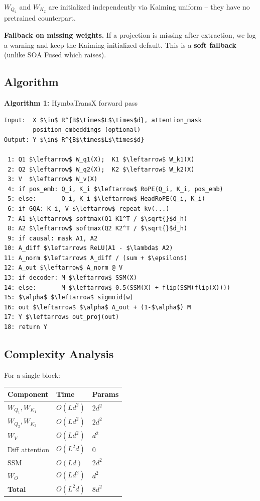 $W_{Q_2}$ and $W_{K_2}$ are initialized independently via Kaiming uniform -- 
they have no pretrained counterpart.

\textbf{Fallback on missing weights.} If a projection is missing after extraction, 
we log a warning and keep the Kaiming-initialized default. This is a 
\textbf{soft fallback} (unlike SOA Fused which raises).

\subsection{Algorithm}

\textbf{Algorithm 1:} HymbaTransX forward pass
\begin{lstlisting}
Input:  X $\in$ R^{B$\times$L$\times$d}, attention_mask
        position_embeddings (optional)
Output: Y $\in$ R^{B$\times$L$\times$d}

 1: Q1 $\leftarrow$ W_q1(X);  K1 $\leftarrow$ W_k1(X)
 2: Q2 $\leftarrow$ W_q2(X);  K2 $\leftarrow$ W_k2(X)
 3: V  $\leftarrow$ W_v(X)
 4: if pos_emb: Q_i, K_i $\leftarrow$ RoPE(Q_i, K_i, pos_emb)
 5: else:       Q_i, K_i $\leftarrow$ HeadRoPE(Q_i, K_i)
 6: if GQA: K_i, V $\leftarrow$ repeat_kv(...)
 7: A1 $\leftarrow$ softmax(Q1 K1^T / $\sqrt{}$d_h)
 8: A2 $\leftarrow$ softmax(Q2 K2^T / $\sqrt{}$d_h)
 9: if causal: mask A1, A2
10: A_diff $\leftarrow$ ReLU(A1 - $\lambda$ A2)
11: A_norm $\leftarrow$ A_diff / (sum + $\epsilon$)
12: A_out $\leftarrow$ A_norm @ V
13: if decoder: M $\leftarrow$ SSM(X)
14: else:       M $\leftarrow$ 0.5(SSM(X) + flip(SSM(flip(X))))
15: $\alpha$ $\leftarrow$ sigmoid(w)
16: out $\leftarrow$ $\alpha$ A_out + (1-$\alpha$) M
17: Y $\leftarrow$ out_proj(out)
18: return Y
\end{lstlisting}

\subsection{Complexity Analysis}

For a single block:

\begin{table}[H]
\centering
\small
\begin{tabular}{lll}
\toprule
\textbf{Component} & \textbf{Time} & \textbf{Params} \\
\midrule
$W_{Q_1}, W_{K_1}$ & $O(L d^2)$ & $2 d^2$ \\
$W_{Q_2}, W_{K_2}$ & $O(L d^2)$ & $2 d^2$ \\
$W_V$ & $O(L d^2)$ & $d^2$ \\
Diff attention & $O(L^2 d)$ & 0 \\
SSM & $O(L d)$ & $2 d^2$ \\
$W_O$ & $O(L d^2)$ & $d^2$ \\
\textbf{Total} & $O(L^2 d)$ & $8 d^2$ \\
\bottomrule
\end{tabular}
\end{table}

